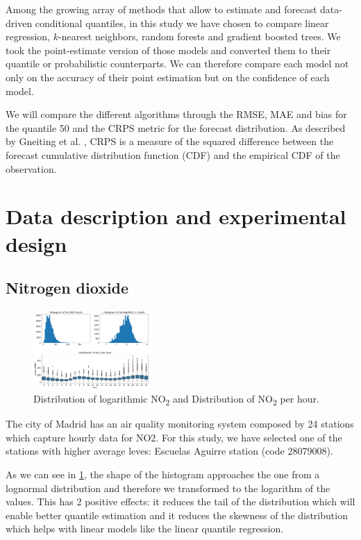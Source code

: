 \documentclass[a4paper,twocolumn,5p]{elsarticle}
\begin{document}
Among the growing array of methods that allow to estimate and forecast
data-driven conditional quantiles, in this study we have chosen to
compare linear regression,  $k$-nearest neighbors,
 random forests and gradient boosted trees. We took
the point-estimate version of those models and converted them 
to their quantile or probabilistic counterparts. We can therefore 
compare each model not only on the accuracy of their point estimation
but on the confidence of each model.

We will compare the different algorithms through the RMSE, MAE 
and bias for the quantile 50 and 
the CRPS metric for the forecast distribution.
As described by Gneiting et al. \cite{gneiting_probabilistic_2014},
CRPS is a measure of the squared difference between the 
forecast cumulative distribution function (CDF) 
and the empirical CDF of the observation.

\section{Data description and experimental design}

\subsection{Nitrogen dioxide}
\label{sec:no2}

\begin{figure}
  \centering
  \includegraphics[width=0.4\textwidth]{histo_variance}
  \caption{\label{figure:histo_variance}Distribution of logarithmic
    NO\textsubscript{2} and Distribution of NO\textsubscript{2}
    per hour.}
\end{figure}

The city of Madrid has an air quality monitoring system composed by 24
stations which capture hourly data for NO2.  For this study, we 
have selected one of
the stations with higher average leves: 
Escuelas Aguirre station (code
28079008).

As we can see in \ref{figure:histo_variance}, the shape of the histogram
approaches the one from a lognormal distribution and therefore we
transformed to the logarithm of the values. This has 2 positive
effects: it reduces the tail of the distribution which will enable
better quantile estimation and it reduces the skewness of the
distribution which helps with linear models like the linear quantile
regression.
\end{document}

